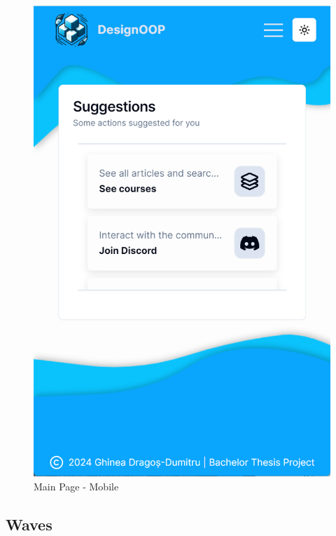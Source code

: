 \begin{figure}[h]
    \centering
    \includegraphics[scale=0.4]{images/main-page-mobile.png}
    \caption{Main Page - Mobile}
    \label{fig:main-page-mobile}
\end{figure}

\subsection{Waves}

